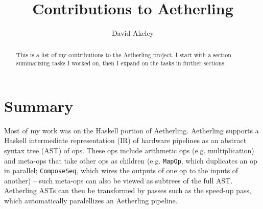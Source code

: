 \documentclass[12pt]{article}
\begin{document}
\sloppy
\title{Contributions to Aetherling}
\author{David Akeley}
\maketitle

\begin{abstract}
This is a list of my contributions to the Aetherling project. I start
with a section summarizing tasks I worked on, then I expand on the
tasks in further sections.
\end{abstract}

\section{Summary}

Most of my work was on the Haskell portion of Aetherling.  Aetherling
supports a Haskell intermediate representation (IR) of hardware
pipelines as an abstract syntax tree (AST) of ops.  These ops include
arithmetic ops (e.g. multiplication) and meta-ops that take other ops
as children (e.g. \texttt{MapOp}, which duplicates an op in parallel;
\texttt{ComposeSeq}, which wires the outputs of one op to the inputs
of another) -- such meta-ops can also be viewed as subtrees of the
full AST. Aetherling ASTs can then be transformed by passes such as
the speed-up pass, which automatically paralellizes an Aetherling
pipeline.
\end{document}
